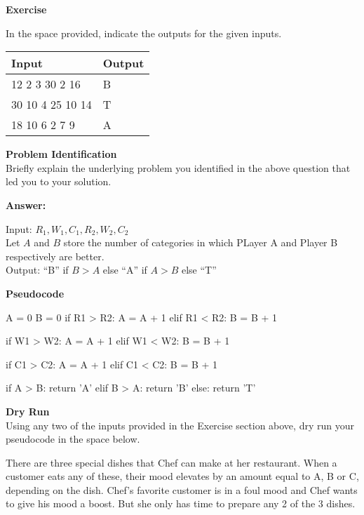 \documentclass[a4paper]{exam}
\newcommand\heading[1]{\textbf{#1}}
\begin{document}
\begin{questions}
    \heading{Exercise}

    In the space provided, indicate the outputs for the given inputs.

    \begin{tabularx}{\textwidth}{|X|X|}
        \rowcolor{gray!50}
        \hline
        Input            & Output \\ \hline\hline
        12 2 3 30 2 16   & B      \\\hline
        30 10 4 25 10 14 & T      \\\hline
        18 10 6 2 7 9    & A      \\\hline
    \end{tabularx}

    \heading{Problem Identification}\\
    Briefly explain the underlying problem you identified in the above question that led you to your solution.

    \heading{Answer:}

    \begin{mdframed}
        Input: $R_1,W_1,C_1,R_2,W_2,C_2$ \\
        Let $A$ and $B$ store the number of categories in which PLayer A and Player B respectively are better.\\
        Output: ``B'' if $B > A$ else ``A'' if $A > B$ else ``T''
      \end{mdframed}

    \heading{Pseudocode}
\begin{python}
A = 0
B = 0
if R1 > R2:
    A = A + 1
elif R1 < R2:
    B = B + 1

if W1 > W2:
    A = A + 1
elif W1 < W2:
    B = B + 1

if C1 > C2:
    A = A + 1
elif C1 < C2:
    B = B + 1

if A > B:
    return 'A'
elif B > A:
    return 'B'
else:
    return 'T'
\end{python}

    \heading{Dry Run}\\
    Using any two of the inputs provided in the Exercise section above, dry run your pseudocode in the space below.
    \vspace*{100pt}




      There are three special dishes that Chef can make at her restaurant. When a customer eats any of these, their mood elevates by an amount equal to A, B or C, depending on the dish. Chef's favorite customer is in a foul mood and Chef wants to give his mood a boost. But she only has time to prepare any 2 of the 3 dishes.


\end{questions}
\end{document}
